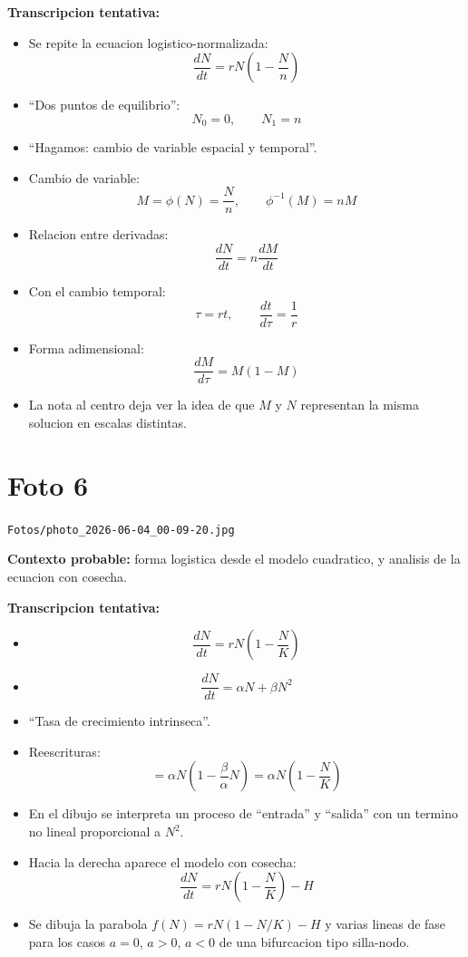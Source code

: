 \documentclass[11pt,letterpaper]{article}
\begin{document}
\textbf{Transcripcion tentativa:}
\begin{itemize}[leftmargin=*]
    \item Se repite la ecuacion logistico-normalizada:
    \[
    \frac{dN}{dt}=rN\left(1-\frac{N}{n}\right)
    \]
    \item ``Dos puntos de equilibrio'':
    \[
    N_0=0, \qquad N_1=n
    \]
    \item ``Hagamos: cambio de variable espacial y temporal''.
    \item Cambio de variable:
    \[
    M=\phi(N)=\frac{N}{n}, \qquad \phi^{-1}(M)=nM
    \]
    \item Relacion entre derivadas:
    \[
    \frac{dN}{dt}=n\frac{dM}{dt}
    \]
    \item Con el cambio temporal:
    \[
    \tau=rt, \qquad \frac{dt}{d\tau}=\frac{1}{r}
    \]
    \item Forma adimensional:
    \[
    \frac{dM}{d\tau}=M(1-M)
    \]
    \item La nota al centro deja ver la idea de que \(M\) y \(N\) representan la misma solucion en escalas distintas.
\end{itemize}

\section*{Foto 6}
\texttt{Fotos/photo\_2026-06-04\_00-09-20.jpg}

\textbf{Contexto probable:} forma logistica desde el modelo cuadratico, y analisis de la ecuacion con cosecha.

\textbf{Transcripcion tentativa:}
\begin{itemize}[leftmargin=*]
    \item \[
    \frac{dN}{dt}=rN\left(1-\frac{N}{K}\right)
    \]
    \item \[
    \frac{dN}{dt}=\alpha N+\beta N^2
    \]
    \item ``Tasa de crecimiento intrinseca''.
    \item Reescrituras:
    \[
    =\alpha N\left(1-\frac{\beta}{\alpha}N\right)
    =\alpha N\left(1-\frac{N}{K}\right)
    \]
    \item En el dibujo se interpreta un proceso de ``entrada'' y ``salida'' con un termino no lineal proporcional a \(N^2\).
    \item Hacia la derecha aparece el modelo con cosecha:
    \[
    \frac{dN}{dt}=rN\left(1-\frac{N}{K}\right)-H
    \]
    \item Se dibuja la parabola \(f(N)=rN(1-N/K)-H\) y varias lineas de fase para los casos \(a=0\), \(a>0\), \(a<0\) de una bifurcacion tipo silla-nodo.
\end{itemize}
\end{document}
